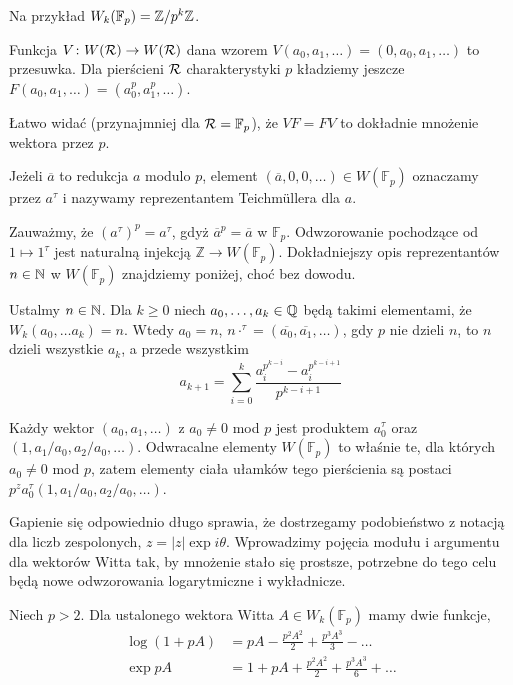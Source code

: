 Na przykład $W_k(\mathbb F_p) = \mathbb Z/p^k\mathbb Z$.

\begin{definicja}
	Funkcja $V \colon W(\mathcal R) \to W(\mathcal R)$ dana wzorem $V(a_0, a_1, \ldots) = (0, a_0, a_1, \ldots)$ to przesuwka.
	Dla pierścieni $\mathcal R$ charakterystyki $p$ kładziemy jeszcze $F(a_0, a_1, \ldots) = (a_0^p, a_1^p, \ldots)$.
\end{definicja}

Łatwo widać (przynajmniej dla $\mathcal R = \mathbb F_p$), że $VF = FV$ to dokładnie mnożenie wektora przez $p$.

\begin{definicja}
	Jeżeli $\overline a$ to redukcja $a$ modulo $p$, element $(\overline a, 0, 0, \ldots) \in W(\mathbb F_p)$ oznaczamy przez $a^\tau$ i nazywamy reprezentantem Teichmüllera dla $a$.
\end{definicja}

Zauważmy, że $(a^\tau)^p = a^\tau$, gdyż $\overline a^p = \overline a$ w $\mathbb F_p$.
Odwzorowanie pochodzące od $1 \mapsto 1^\tau$ jest naturalną injekcją $\mathbb Z \to W(\mathbb F_p)$.
Dokładniejszy opis reprezentantów $n \in \mathbb N$ w $W(\mathbb F_p)$ znajdziemy poniżej, choć bez dowodu.

\begin{fakt}
	Ustalmy $n \in \mathbb N$.
	Dla $k \ge 0$ niech $a_0, \ldots, a_k \in \mathbb Q$ będą takimi elementami, że $W_k(a_0, \ldots a_k) = n$.
	Wtedy $a_0 = n$, $n \cdot ^\tau = (\overline{a_0}, \overline{a_1}, \ldots)$, gdy $p$ nie dzieli $n$, to $n$ dzieli wszystkie $a_k$, a przede wszystkim
	\[
		a_{k+1} = \sum_{i=0}^k \frac{a_i^{p^{k-i}} - a_i^{p^{k-i+1}}}{p^{k-i+1}}
	\]
\end{fakt}

Każdy wektor $(a_0, a_1, \ldots)$ z $a_0 \neq 0$ mod $p$ jest produktem $a_0^\tau$ oraz $(1, a_1/a_0, a_2/a_0, \ldots)$.
Odwracalne elementy $W(\mathbb F_p)$ to właśnie te, dla których $a_0 \neq 0$ mod $p$, zatem elementy ciała ułamków tego pierścienia są postaci $p^z a_0^\tau (1, a_1/a_0, a_2/a_0, \ldots)$.

Gapienie się odpowiednio długo sprawia, że dostrzegamy podobieństwo z notacją dla liczb zespolonych, $z = |z| \exp i \theta$.
Wprowadzimy pojęcia modułu i argumentu dla wektorów Witta tak, by mnożenie stało się prostsze, potrzebne do tego celu będą nowe odwzorowania logarytmiczne i wykładnicze.

\begin{definicja}
	Niech $p > 2$.
	Dla ustalonego wektora Witta $A \in W_k(\mathbb F_p)$ mamy dwie funkcje,
	\begin{align*}
	\log(1 + pA) & = pA - \frac{p^2A^2}{2} + \frac{p^3A^3}{3} - \ldots \\
	\exp pA & = 1 + pA + \frac{p^2A^2}{2} + \frac{p^3A^3}{6} + \ldots
	\end{align*}
\end{definicja}

